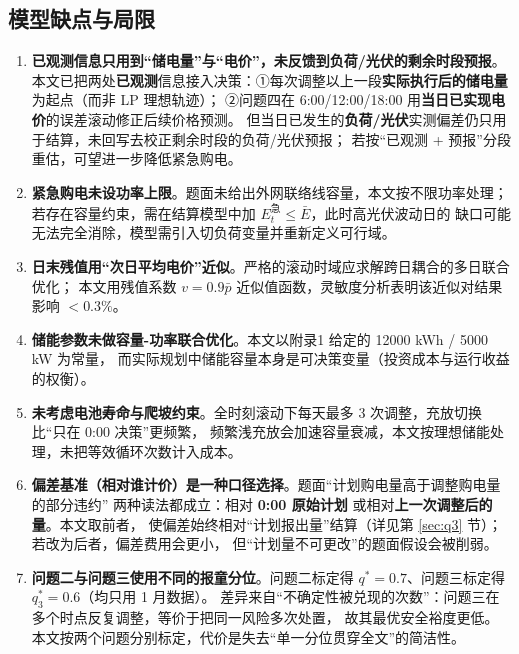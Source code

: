 \documentclass[12pt,a4paper,fontset=fandol]{ctexart}
\begin{document}
\subsection{模型缺点与局限}

\begin{enumerate}[label=(\arabic*), leftmargin=2.2em, itemsep=2pt]
\item \textbf{已观测信息只用到“储电量\nobreak”与“电价\nobreak”，未反馈到负荷/光伏的剩余时段预报}\nobreak。
本文已把两处\textbf{已观测}信息接入决策\nobreak：①每次调整以上一段\textbf{实际执行后的储电量}为起点（而非 LP 理想轨迹\nobreak）\nobreak；
②问题四在 6:00/12:00/18:00 用\textbf{当日已实现电价}的误差滚动修正后续价格预测\nobreak。
但当日已发生的\textbf{负荷/光伏}实测偏差仍只用于结算\nobreak，未回写去校正剩余时段的负荷/光伏预报\nobreak；
若按“已观测 + 预报\nobreak”分段重估\nobreak，可望进一步降低紧急购电\nobreak。
\item \textbf{紧急购电未设功率上限}\nobreak。题面未给出外网联络线容量\nobreak，本文按不限功率处理\nobreak；
若存在容量约束\nobreak，需在结算模型中加 $E^{\text{急}}_t\le \bar E$\nobreak，此时高光伏波动日的
缺口可能无法完全消除\nobreak，模型需引入切负荷变量并重新定义可行域\nobreak。
\item \textbf{日末残值用“次日平均电价\nobreak”近似}\nobreak。严格的滚动时域应求解跨日耦合的多日联合优化\nobreak；
本文用残值系数 $v=0.9\bar p$ 近似值函数\nobreak，灵敏度分析表明该近似对结果影响 $<0.3\text{\%}$\nobreak。
\item \textbf{储能参数未做容量-功率联合优化}\nobreak。本文以附录1 给定的 12000 kWh / 5000 kW 为常量\nobreak，
而实际规划中储能容量本身是可决策变量（投资成本与运行收益的权衡\nobreak）\nobreak。
\item \textbf{未考虑电池寿命与爬坡约束}\nobreak。全时刻滚动下每天最多 3 次调整\nobreak，充放切换比“只在 0:00 决策\nobreak”更频繁\nobreak，
频繁浅充放会加速容量衰减\nobreak，本文按理想储能处理\nobreak，未把等效循环次数计入成本\nobreak。
\item \textbf{偏差基准（相对谁计价\nobreak）是一种口径选择}\nobreak。题面“计划购电量高于调整购电量的部分违约\nobreak”
两种读法都成立\nobreak：相对 \textbf{0:00 原始计划\nobreak} 或相对\textbf{上一次调整后的量\nobreak}。本文取前者\nobreak，
使偏差始终相对“计划报出量\nobreak”结算（详见第 \ref{sec:q3} 节\nobreak）；若改为后者\nobreak，偏差费用会更小\nobreak，
但“计划量不可更改\nobreak”的题面假设会被削弱\nobreak。
\item \textbf{问题二与问题三使用不同的报童分位}\nobreak。问题二标定得 $q^*=0.7$\nobreak、问题三标定得 $q_3^*=0.6$（均只用 1 月数据\nobreak）\nobreak。
差异来自“不确定性被兑现的次数\nobreak”：问题三在多个时点反复调整\nobreak，等价于把同一风险多次处置\nobreak，
故其最优安全裕度更低\nobreak。本文按两个问题分别标定\nobreak，代价是失去“单一分位贯穿全文\nobreak”的简洁性\nobreak。
\end{enumerate}
\end{document}
